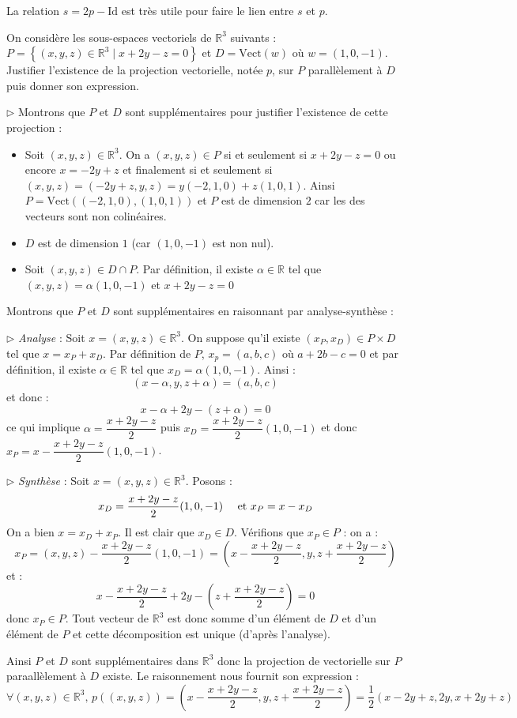 \documentclass[french,11pt,twoside]{VcCours}
\renewcommand{\trou}[1]{{\color{blue}#1}}
\begin{document}
\begin{Remarque}{} 
	La relation $s=2p-\textrm{Id}$ est très utile pour faire le lien entre $s$ et $p$.
\end{Remarque}


\begin{Exemple} On considère les sous-espaces vectoriels de $\mathbb{R}^3 $ suivants : $P = \left\{ {(x,y,z) \in \mathbb{R}^3 \mid x + 2y - z = 0} \right\}$ et $D = \textrm{Vect} (w){\text{ o\`u }}w = (1,0, - 1)$. Justifier l'existence de la projection vectorielle, notée $p$, sur $P$ parallèlement à $D$ puis donner son expression.

\trou{
$\rhd$ Montrons que $P$ et $D$ sont supplémentaires pour justifier l'existence de cette projection :

\begin{itemize}
\item Soit $(x,y,z) \in \mathbb{R}^3$. On a $(x,y,z) \in P$ si et seulement si $x+2y-z=0$ ou encore $x=-2y+z$ et finalement si et seulement si $(x,y,z) = (-2y+z,y,z) = y(-2,1,0)+z(1,0,1)$. Ainsi $P = \textrm{Vect}((-2,1,0),(1,0,1))$ et $P$ est de dimension $2$ car les des vecteurs sont non colinéaires.
\item $D$ est de dimension $1$ (car $(1,0,-1)$ est non nul).
\item Soit $(x,y,z) \in D \cap P$. Par définition, il existe $\alpha \in \mathbb{R}$ tel que $(x,y,z)= \alpha (1,0,-1)$ et $x+2y-z=0$
\end{itemize}
}

Montrons que $P$ et $D$ sont supplémentaires en raisonnant par analyse-synthèse :

\trou{
$\rhd$ \emph{Analyse} : Soit $x=(x,y,z) \in \mathbb{R}^3$. On suppose qu'il existe $(x_P,x_D) \in P \times D$ tel que $x=x_P+x_D$. Par définition de $P$, $x_p=(a,b,c)$ où $a+2b-c=0$ et par définition, il existe $\alpha \in \mathbb{R}$ tel que $x_D= \alpha (1,0,-1)$. Ainsi :
$$ (x-\alpha, y, z + \alpha) = (a,b,c)$$
et donc :
$$ x- \alpha + 2y- (z + \alpha) = 0$$
ce qui implique $\alpha = \dfrac{x+2y-z}{2}$ puis $x_D =  \dfrac{x+2y-z}{2}(1,0,-1)$ et donc $x_P = x-\dfrac{x+2y-z}{2} (1,0,-1)$.

\medskip

$\rhd$ \emph{Synthèse} : Soit $x =(x,y,z) \in \mathbb{R}^3$. Posons :
$$ x_D =  \dfrac{x+2y-z}{2}(1,0,-1) \quad \hbox{ et } x_P = x-x_D$$
On a bien $x=x_D+x_P$. Il est clair que $x_D \in D$. Vérifions que $x_P \in P$ : on a :
$$ x_P = (x,y,z)  -\dfrac{x+2y-z}{2} (1,0,-1) = \left(x- \dfrac{x+2y-z}{2}, y, z+ \dfrac{x+2y-z}{2} \right)$$
et :
$$ x- \dfrac{x+2y-z}{2} + 2y - \left( z+ \dfrac{x+2y-z}{2} \right) = 0$$
donc $x_P \in P$. Tout vecteur de $\mathbb{R}^3$ est donc somme d'un élément de $D$ et d'un élément de $P$ et cette décomposition est unique (d'après l'analyse).

\medskip

Ainsi $P$ et $D$ sont supplémentaires dans $\mathbb{R}^3$ donc la projection de vectorielle sur $P$ paraallèlement à $D$ existe. Le raisonnement nous fournit son expression : 
$$ \forall (x,y,z) \in \mathbb{R}^3, \, p((x,y,z))= \left(x- \dfrac{x+2y-z}{2}, y, z+ \dfrac{x+2y-z}{2} \right) = \dfrac{1}{2} \left(x-2y+z , 2y, x+2y+z \right)$$
}
\end{Exemple}
\end{document}
